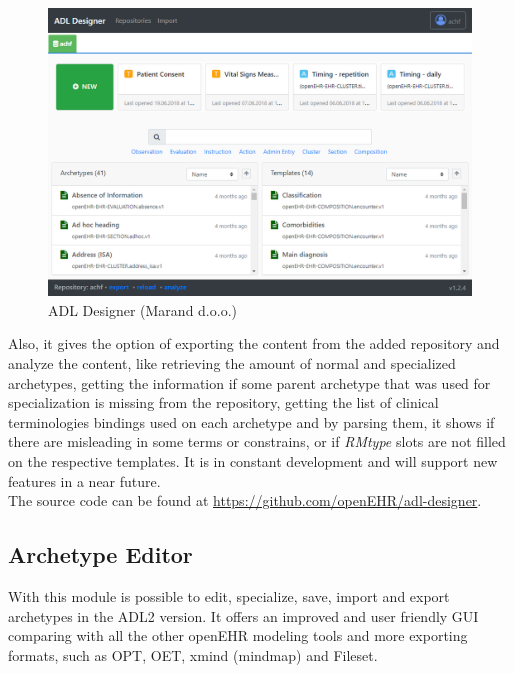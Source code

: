 \documentclass[mim_thesis.tex]{subfiles}
\begin{document}
\begin{figure}[H]
	\centering
    \includegraphics[width=1\textwidth]{img/adldesigner.PNG}
	\caption{ADL Designer (Marand d.o.o.)}
	\label{fig:adldesigner}
\end{figure}

Also, it gives the option of exporting the content from the added repository and analyze the content, like retrieving the amount of normal and specialized archetypes, getting the information if some parent archetype that was used for specialization is missing from the repository, getting the list of clinical terminologies bindings used on each archetype and by parsing them, it shows if there are misleading in some terms or constrains, or if \textit{RMtype} slots are not filled on the respective templates. It is in constant development and will support new features in a near future.  \\

The source code can be found at \url{https://github.com/openEHR/adl-designer}. 

\subsection{Archetype Editor}
With this module is possible to edit, specialize, save, import and export archetypes in the ADL2 version. It offers an improved and user friendly GUI comparing with all the other openEHR modeling tools and more exporting formats, such as OPT, OET, xmind (mindmap) and Fileset.
\end{document}
